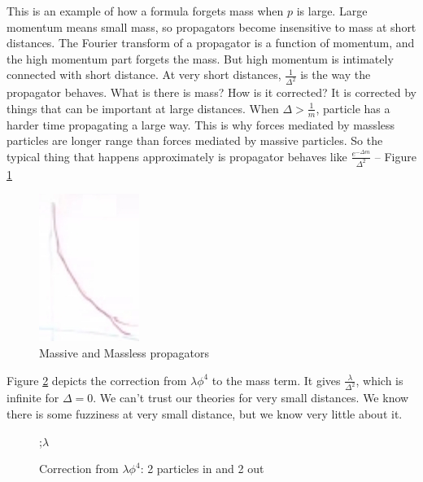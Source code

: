 \documentclass[]{article}
\begin{document}
This is an example of how a formula forgets mass when $p$ is  large. Large momentum means small mass, so propagators become insensitive to mass at short distances. The Fourier transform of a propagator is a function of momentum, and the high momentum part forgets the mass. But high momentum is intimately connected with short distance. At very short distances, $\frac{1}{\Delta^2}$ is the way the propagator behaves. What is there is mass? How is it corrected? It is corrected by things that can be important at large distances. When $\Delta > \frac{1}{m}$, particle has a harder time propagating a large way. This is why forces mediated by massless particles are longer range than forces mediated by massive particles. So the typical thing that happens approximately is propagator behaves like  $\frac{e^{- \Delta m}}{\Delta^2}$ -- Figure \ref{fig:particles3-3-massive-and-massless-propagators}

\begin{figure}[H]
	\caption{Massive and Massless propagators}\label{fig:particles3-3-massive-and-massless-propagators}
	\includegraphics{particles3-3-massive-and-massless-propagators}
\end{figure}

Figure \ref{fig:particles3-3-loops-p} depicts the correction from $\lambda \phi^4$ to the mass term. It gives $\frac{\lambda}{\Delta^2}$, which is infinite for $\Delta=0$. We can't trust our theories for very small distances. We know there is some fuzziness at very small distance, but we know very little about it. 

\begin{figure}[h]
	\begin{center}
		\caption{Correction from $\lambda \phi^4$: 2 particles in and 2 out}\label{fig:particles3-3-loops-p}
		;$\lambda$
	\end{center}
\end{figure}
\end{document}
